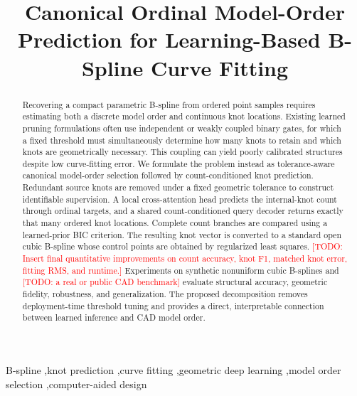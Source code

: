 \documentclass[preprint,12pt]{elsarticle}
\newcommand{\TODO}[1]{\textcolor{red}{[TODO: #1]}}
\begin{document}
\begin{frontmatter}

\title{Canonical Ordinal Model-Order Prediction for Learning-Based
B-Spline Curve Fitting}


\begin{abstract}
Recovering a compact parametric B-spline from ordered point samples requires
estimating both a discrete model order and continuous knot locations. Existing
learned pruning formulations often use independent or weakly coupled binary
gates, for which a fixed threshold must simultaneously determine how many knots
to retain and which knots are geometrically necessary. This coupling can yield
poorly calibrated structures despite low curve-fitting error. We formulate the
problem instead as tolerance-aware canonical model-order selection followed by
count-conditioned knot prediction. Redundant source knots are removed under a
fixed geometric tolerance to construct identifiable supervision. A local
cross-attention head predicts the internal-knot count through ordinal targets,
and a shared count-conditioned query decoder returns exactly that many ordered
knot locations. Complete count branches are compared using a learned-prior BIC
criterion. The resulting knot vector is converted
to a standard open cubic B-spline whose control points are obtained by regularized
least squares. \TODO{Insert final quantitative improvements on count accuracy,
knot F1, matched knot error, fitting RMS, and runtime.} Experiments on synthetic
nonuniform cubic B-splines and \TODO{a real or public CAD benchmark} evaluate
structural accuracy, geometric fidelity, robustness, and generalization. The
proposed decomposition removes deployment-time threshold tuning and provides a
direct, interpretable connection between learned inference and CAD model order.
\end{abstract}

\begin{keyword}
B-spline \sep knot prediction \sep curve fitting \sep geometric deep learning
\sep model order selection \sep computer-aided design
\end{keyword}

\end{frontmatter}








\end{document}
